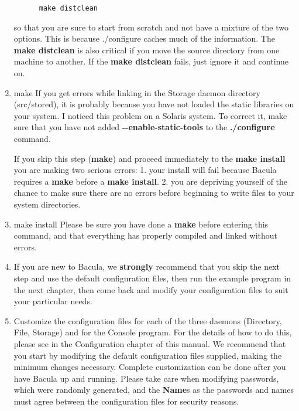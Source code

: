 \begin{enumerate}
\footnotesize
\begin{verbatim}
      make distclean
\end{verbatim}
\normalsize

so that you are sure to start from scratch and not have a  mixture of the two
options. This is because ./configure  caches much of the information. The {\bf
make distclean}  is also critical if you move the source directory from one 
machine to another. If the {\bf make distclean} fails,  just ignore it and
continue on.  

\item make  
   If you get errors while linking in the Storage daemon directory
   (src/stored), it is probably because you have not loaded the static
   libraries on your system.  I noticed this problem on a Solaris system.
   To correct it, make sure that you have not added {\bf
   {-}{-}enable-static-tools} to the {\bf ./configure} command.

   If you skip this step ({\bf make}) and proceed immediately to the {\bf
   make install} you are making two serious errors: 1.  your install will
   fail because Bacula requires a {\bf make} before a {\bf make install}.
   2.  you are depriving yourself of the chance to make sure there are no
   errors before beginning to write files to your system directories.
                                 

\item make install  
   Please be sure you have done a {\bf make} before entering this command,
   and that everything has properly compiled and linked without errors.


\item If you are new to Bacula, we {\bf strongly} recommend that you skip
   the next step and use the default configuration files, then run the
   example program in the next chapter, then come back and modify your
   configuration files to suit your particular needs.

\item Customize the configuration files for each of the three daemons 
   (Directory, File, Storage) and for the Console program.  For the details
   of how to do this, please see  in the Configuration chapter of this manual.  We
   recommend that you start by modifying the default configuration files
   supplied, making the minimum changes necessary.  Complete customization
   can be done after you have Bacula up and running.  Please take care when
   modifying passwords, which were randomly generated, and the {\bf Name}s
   as the passwords and names must agree between the configuration files
   for security reasons.  


\end{enumerate}
